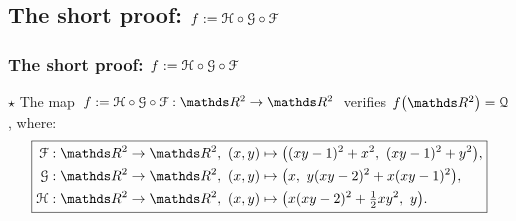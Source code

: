 \documentclass{beamer}
\begin{document}
\subsection{The short proof: $f:=\mathcal{H}\circ\mathcal{G}\circ\mathcal{F}$}
\begin{frame}
\frametitle{The short proof: $f:=\mathcal{H}\circ\mathcal{G}\circ\mathcal{F}$} 
$\star$ The map $f:=\HH\circ\GG\circ\FF:\R^2\to\R^2$ verifies $f\big(\R^2\big) = \Qu$, where:
\begin{equation*}\label{eq:secondMap}
\boxed{
\begin{aligned}
\FF:\R^2\to\R^2,\ (x,y)&\mapsto\big((xy-1)^2+x^2,\ (xy-1)^2+y^2\big),\\
\GG:\R^2\to\R^2,\ (x,y)&\mapsto\big(x,\ y(xy-2)^2+x(xy-1)^2\big),\\
\HH:\R^2\to\R^2,\ (x,y)&\mapsto\big(x(xy-2)^2+\tfrac{1}{2}xy^2,\ y\big). \\
\end{aligned}
}
\end{equation*}
\vspace{-0.4cm}

\begin{columns}
\begin{column}{0.5\textwidth}
\begin{figure}
\end{figure}
\end{column}


\end{columns}
\end{frame}
\end{document}
